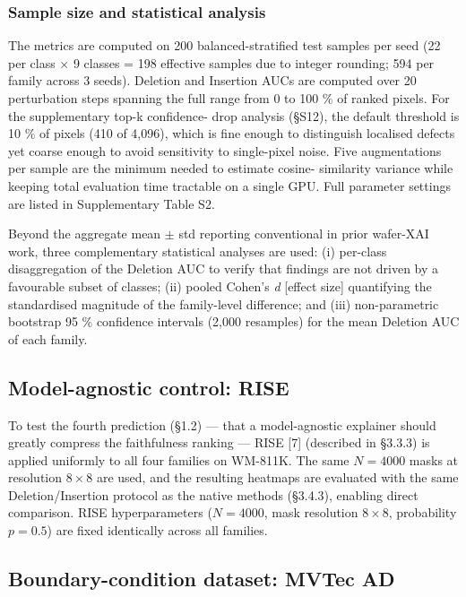 \documentclass[11pt,a4paper]{article}
\begin{document}
\subsubsection{Sample size and statistical analysis}

The metrics are computed on 200 balanced-stratified test samples per seed (22 per class $\times$ 9 classes = 198 effective samples due to integer rounding; 594 per family across 3 seeds). Deletion and Insertion AUCs are computed over 20 perturbation steps spanning the full range from 0 to 100 \% of ranked pixels. For the supplementary top-k confidence- drop analysis (\S{}S12), the default threshold is 10 \% of pixels (410 of 4,096), which is fine enough to distinguish localised defects yet coarse enough to avoid sensitivity to single-pixel noise. Five augmentations per sample are the minimum needed to estimate cosine- similarity variance while keeping total evaluation time tractable on a single GPU. Full parameter settings are listed in Supplementary Table S2.

Beyond the aggregate mean $\pm$ std reporting conventional in prior wafer-XAI work, three complementary statistical analyses are used: (i) per-class disaggregation of the Deletion AUC to verify that findings are not driven by a favourable subset of classes; (ii) pooled Cohen's \emph{d} [effect size] quantifying the standardised magnitude of the family-level difference; and (iii) non-parametric bootstrap 95 \% confidence intervals (2,000 resamples) for the mean Deletion AUC of each family.

\subsection{Model-agnostic control: RISE}

To test the fourth prediction (\S{}1.2) --- that a model-agnostic explainer should greatly compress the faithfulness ranking --- RISE [7] (described in \S{}3.3.3) is applied uniformly to all four families on WM-811K. The same $N{=}4000$ masks at resolution $8{\times}8$ are used, and the resulting heatmaps are evaluated with the same Deletion/Insertion protocol as the native methods (\S{}3.4.3), enabling direct comparison. RISE hyperparameters ($N{=}4000$, mask resolution $8{\times}8$, probability $p{=}0.5$) are fixed identically across all families.

\subsection{Boundary-condition dataset: MVTec AD}
\end{document}
